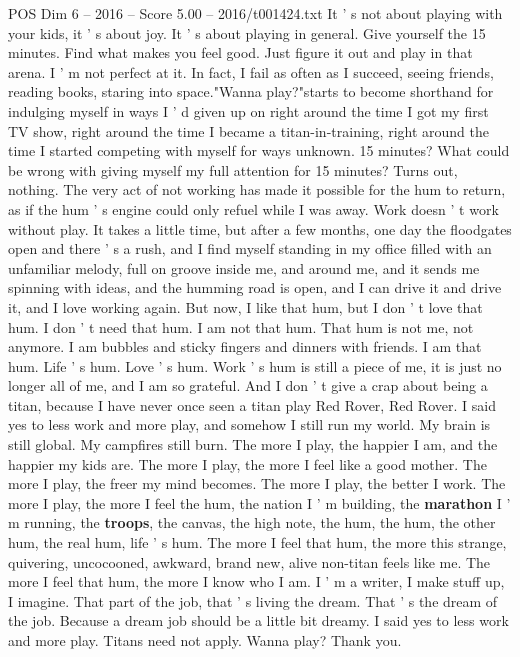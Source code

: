 \begin{textsample}{POS Dim 6 – 2016 – Score 5.00 – 2016/t001424.txt}
It ' s not about playing with your kids, it ' s about joy.
It ' s about playing in general.
Give yourself the 15 minutes.
Find what makes you feel good.
Just figure it out and play in that arena.
I ' m not perfect at it.
In fact, I fail as often as I succeed, seeing friends, reading books, staring into space."Wanna play?"starts to become shorthand for indulging myself in ways I ' d given up on right around the time I got my first TV show, right around the time I became a titan-in-training, right around the time I started competing with myself for ways unknown. 15 minutes?
What could be wrong with giving myself my full attention for 15 minutes?
Turns out, nothing.
The very act of not working has made it possible for the hum to return, as if the hum ' s engine could only refuel while I was away.
Work doesn ' t work without play.
It takes a little time, but after a few months, one day the floodgates open and there ' s a rush, and I find myself standing in my office filled with an unfamiliar melody, full on groove inside me, and around me, and it sends me spinning with ideas, and the humming road is open, and I can drive it and drive it, and I love working again.
But now, I like that hum, but I don ' t love that hum.
I don ' t need that hum.
I am not that hum.
That hum is not me, not anymore.
I am bubbles and sticky fingers and dinners with friends.
I am that hum.
Life ' s hum.
Love ' s hum.
Work ' s hum is still a piece of me, it is just no longer all of me, and I am so grateful.
And I don ' t give a crap about being a titan, because I have never once seen a titan play Red Rover, Red Rover.
I said yes to less work and more play, and somehow I still run my world.
My brain is still global.
My campfires still burn.
The more I play, the happier I am, and the happier my kids are.
The more I play, the more I feel like a good mother.
The more I play, the freer my mind becomes.
The more I play, the better I work.
The more I play, the more I feel the hum, the nation I ' m building, the \textbf{marathon} I ' m running, the \textbf{troops}, the canvas, the high note, the hum, the hum, the other hum, the real hum, life ' s hum.
The more I feel that hum, the more this strange, quivering, uncocooned, awkward, brand new, alive non-titan feels like me.
The more I feel that hum, the more I know who I am.
I ' m a writer, I make stuff up, I imagine.
That part of the job, that ' s living the dream.
That ' s the dream of the job.
Because a dream job should be a little bit dreamy.
I said yes to less work and more play.
Titans need not apply.
Wanna play?
Thank you.

\end{textsample}
